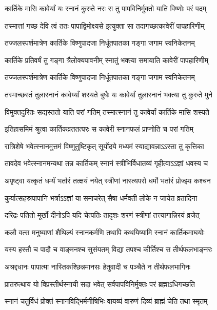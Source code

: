 \twolineshloka
{कार्तिके मासि कावेर्यां यः स्नानं कुरुते नरः}
{स तु पापविनिर्मुक्तो याति विष्णोः परं पदम्} %

\twolineshloka
{तस्मात्तां गच्छ देवि त्वं ततः पापाद्विमोक्ष्यसे}
{इत्युक्ता सा तदागच्छत्कावेरीं पापहारिणीम्} %

\twolineshloka
{तज्जलस्पर्शमात्रेण कार्तिके विष्णुपादजा}
{निर्धूतपातका गङ्गा जगाम स्वनिकेतनम्} %

\twolineshloka
{कार्तिके प्रतिवर्षं तु गङ्गा त्रैलोक्यपावनीम्}
{स्नातुं भक्त्या समायाति कावेरीं पापहारिणीम्} %

\twolineshloka
{तज्जलस्पर्शमात्रेण कार्तिके विष्णुपादजा}
{निर्धूतपातका गङ्गा जगाम स्वनिकेतनम्} %

\twolineshloka
{तस्माच्छस्तं तुलास्नानं कावेर्य्यां शस्यते बुधैः}
{यः कावेर्यां तुलास्नानं भक्त्या तु कुरुते मुने} %

\twolineshloka
{विमुक्तदुरितः सद्यस्ततो याति परां गतिम्}
{तस्मात्स्नानं तु कावेर्यां कार्तिके मासि शस्यते} %

\twolineshloka
{इतिहासमिमं श्रुत्वा कार्तिकव्रततत्परः}
{स कावेरी स्नानफलं प्राप्नोति च परां गतिम्} %

\twolineshloka
{रात्रिशेषे भवेत्स्नानमुत्तमं विष्णुतुष्टिकृत्}
{सूर्योदये मध्यमं स्याद्यावन्नाऽऽस्ता तु कृत्तिका} %

\twolineshloka
{तावदेव भवेत्स्नानमन्यथा तन्न कार्तिकम्}
{स्नानं स्त्रीभिर्विधातव्यं गृहीत्वाऽऽज्ञां धवस्य च} %

\twolineshloka
{अपृष्ट्वा यत्कृतं धर्म्यं भर्तारं तत्क्षयं नयेत्}
{स्त्रीणां नास्त्यपरो धर्मो भर्तारं प्रोज्झ्य कश्चन} %

\twolineshloka
{कुर्यात्सहस्रपापानि भर्त्राऽऽज्ञां या समाचरेत्}
{सैषा धर्मवती लोके न जायेत व्रतादिना} %

\twolineshloka
{दरिद्रः पतितो मूर्खो दीनोऽपि यदि चेत्पतिः}
{तादृशः शरणं स्त्रीणां तत्त्यागान्निरयं व्रजेत्} %

\twolineshloka
{कलौ वत्स मनुष्याणां शैथिल्यं स्नानकर्मणि}
{तथापि कथयिष्यामि स्नानं कार्तिकमाघयोः} %

\twolineshloka
{यस्य हस्तौ च पादौ च वाङ्मनश्च सुसंयतम्}
{विद्या तपश्च कीर्तिश्च स तीर्थफलभाङ्नरः} %

\twolineshloka
{अश्रद्दधानः पापात्मा नास्तिकश्छिन्नमानसः}
{हेतुवादी च पञ्चैते न तीर्थफलभागिनः} %

\twolineshloka
{प्रातरुत्थाय यो विप्रस्तीर्थस्नायी सदा भवेत्}
{सर्वपापविनिर्मुक्तः परं ब्रह्माऽधिगच्छति} %

\twolineshloka
{स्नानं चतुर्विधं प्रोक्तं स्नानविद्भिर्मनीषिभिः}
{वायव्यं वारुणं दिव्यं ब्राह्मं चेति तथा स्मृतम्} %

